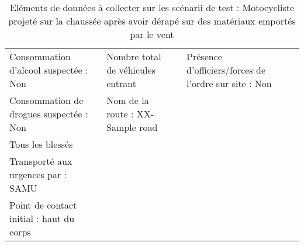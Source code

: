 \documentclass[a4paper,12pt,twoside,french]{book}
[a4paper,12pt,twoside]
\begin{document}
\begin{landscape}
\begin{table}[]
\begin{adjustbox}{width=2.1\textwidth,center=\textwidth}
\begin{tabular}{|l|l|l|l|l|}
Consommation d'alcool suspectée : Non                                                        & Nombre total de véhicules entrant                          &                                                                                     & Présence d'officiers/forces de l'ordre sur site : Non &  \\
Consommation de drogues suspectée : Non                                                      & Nom de la route : XX-Sample road                           &                                                                                     &                                                       &  \\
{\color[HTML]{196B24} Tous les blessés}                                                      &                                                            &                                                                                     &                                                       &  \\
Transporté aux urgences par : SAMU                                                           &                                                            &                                                                                     &                                                       &  \\
Point de contact initial : haut du corps                                                     &                                                            &                                                                                     &                                                       & \\
\hline
\end{tabular}
\end{adjustbox}
\caption{Eléments de données à collecter sur les scénarii de test : Motocycliste   projeté sur la chaussée après avoir dérapé sur des matériaux emportés par le   vent}
\label{tab:collect_scenario_1}
\end{table}
\end{landscape}
\end{document}
